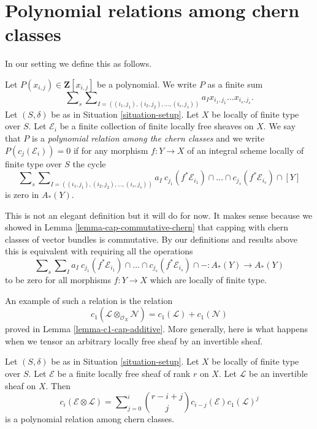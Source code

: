 \section{Polynomial relations among chern classes}
\label{section-relations-chern-classes}

\noindent
In our setting we define this as follows.

\begin{definition}
\label{definition-polynomial-relation-chern-classes}
Let $P(x_{i, j}) \in \mathbf{Z}[x_{i, j}]$ be a polynomial.
We write $P$ as a finite sum
$$
\sum\nolimits_s
\sum\nolimits_{I = ((i_1, j_1), (i_2, j_2), \ldots, (i_s, j_s))}
a_I x_{i_1, j_1} \ldots x_{i_s, j_s}.
$$
Let $(S, \delta)$ be as in Situation \ref{situation-setup}.
Let $X$ be locally of finite type over $S$.
Let $\mathcal{E}_i$ be a finite collection of finite
locally free sheaves on $X$. We say that $P$
is a {\it polynomial relation among the chern classes}
and we write $P(c_j(\mathcal{E}_i)) = 0$
if for any morphism $f : Y \to X$ of an integral scheme
locally of finite type over $S$ the cycle
$$
\sum\nolimits_s
\sum\nolimits_{I = ((i_1, j_1), (i_2, j_2), \ldots, (i_s, j_s))}
a_I\ c_{j_1}(f^*\mathcal{E}_{i_1}) \cap \ldots
\cap c_{j_s}(f^*\mathcal{E}_{i_s}) \cap [Y]
$$
is zero in $A_*(Y)$.
\end{definition}

\noindent
This is not an elegant definition but it will do
for now. It makes sense because we showed in
Lemma \ref{lemma-cap-commutative-chern} that
capping with chern classes of vector bundles is commutative.
By our definitions and results above
this is equivalent with requiring all the
operations
$$
\sum\nolimits_s
\sum\nolimits_I
a_I\ c_{j_1}(f^*\mathcal{E}_{i_1}) \cap \ldots
\cap c_{j_s}(f^*\mathcal{E}_{i_s}) \cap - :
A_*(Y) \to A_*(Y)
$$
to be zero for all morphisms $f : Y \to X$ which are locally of finite type.

\medskip\noindent
An example of such a relation is the relation
$$
c_1(\mathcal{L} \otimes_{\mathcal{O}_X} \mathcal{N})
=
c_1(\mathcal{L}) + c_1(\mathcal{N})
$$
proved in Lemma \ref{lemma-c1-cap-additive}.
More generally, here is what happens when we tensor an
arbitrary locally free sheaf by an invertible sheaf.

\begin{lemma}
\label{lemma-chern-classes-E-tensor-L}
Let $(S, \delta)$ be as in Situation \ref{situation-setup}.
Let $X$ be locally of finite type over $S$.
Let $\mathcal{E}$ be a finite locally free sheaf of
rank $r$ on $X$. Let $\mathcal{L}$ be an invertible
sheaf on $X$. Then
\begin{equation}
\label{equation-twist}
c_i({\mathcal E} \otimes {\mathcal L})
=
\sum\nolimits_{j = 0}^i
\binom{r - i + j}{j} c_{i - j}({\mathcal E}) c_1({\mathcal L})^j
\end{equation}
is a polynomial relation among chern classes.
\end{lemma}

